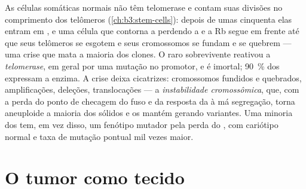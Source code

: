 \begin{definition}\label{def:b3:cancer-biology:telomerase}
As células somáticas normais não têm telomerase e contam suas divisões
no comprimento dos telômeros (\cref{ch:b3:stem-cells}): depois de umas
cinquenta elas entram em , e uma célula que contorna a
 perdendo a  e a Rb segue em frente até que seus
telômeros se esgotem e seus cromossomos se fundam e se quebrem --- uma
crise que mata a maioria dos clones. O raro sobrevivente reativou a
\emph{telomerase}, em geral por uma mutação no promotor, e é imortal;
\qty{90}{\%} dos  expressam a enzima. A crise deixa cicatrizes:
cromossomos fundidos e quebrados, amplificações, deleções,
translocações --- a \emph{instabilidade cromossômica}, que, com a perda
do ponto de checagem do fuso e da resposta da  à má segregação,
torna aneuploide a maioria dos  sólidos e os mantém gerando
variantes. Uma minoria dos  tem, em vez disso, um fenótipo
mutador pela perda do , com cariótipo normal e
taxa de mutação pontual mil vezes maior.
\end{definition}

\section{O tumor como tecido}

